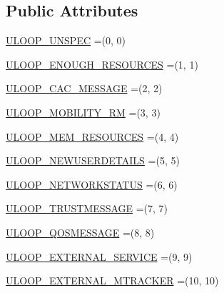 \subsection*{Public Attributes}
\begin{DoxyCompactItemize}
\item 
\hyperlink{enumeu_1_1uloop_1_1messages_1_1UloopMessages_1_1UloopMessageType_a457cbfce646e37005987a686aa1f876e}{U\+L\+O\+O\+P\+\_\+\+U\+N\+S\+P\+E\+C} =(0, 0)
\item 
\hyperlink{enumeu_1_1uloop_1_1messages_1_1UloopMessages_1_1UloopMessageType_ad2d2caa5e4a4fd68d44f422b23af44ac}{U\+L\+O\+O\+P\+\_\+\+E\+N\+O\+U\+G\+H\+\_\+\+R\+E\+S\+O\+U\+R\+C\+E\+S} =(1, 1)
\item 
\hyperlink{enumeu_1_1uloop_1_1messages_1_1UloopMessages_1_1UloopMessageType_a7290b987c0c214555491be7c4fc45835}{U\+L\+O\+O\+P\+\_\+\+C\+A\+C\+\_\+\+M\+E\+S\+S\+A\+G\+E} =(2, 2)
\item 
\hyperlink{enumeu_1_1uloop_1_1messages_1_1UloopMessages_1_1UloopMessageType_a4c6be9e1d2048fb126a0c309ed5e8acf}{U\+L\+O\+O\+P\+\_\+\+M\+O\+B\+I\+L\+I\+T\+Y\+\_\+\+R\+M} =(3, 3)
\item 
\hyperlink{enumeu_1_1uloop_1_1messages_1_1UloopMessages_1_1UloopMessageType_acfcddc123ef961d02b619e0e687a625a}{U\+L\+O\+O\+P\+\_\+\+M\+E\+M\+\_\+\+R\+E\+S\+O\+U\+R\+C\+E\+S} =(4, 4)
\item 
\hyperlink{enumeu_1_1uloop_1_1messages_1_1UloopMessages_1_1UloopMessageType_afe52072954431f52c76dfc1abcc26807}{U\+L\+O\+O\+P\+\_\+\+N\+E\+W\+U\+S\+E\+R\+D\+E\+T\+A\+I\+L\+S} =(5, 5)
\item 
\hyperlink{enumeu_1_1uloop_1_1messages_1_1UloopMessages_1_1UloopMessageType_a9e9d5e8074b3576749dcd41a7cc4545c}{U\+L\+O\+O\+P\+\_\+\+N\+E\+T\+W\+O\+R\+K\+S\+T\+A\+T\+U\+S} =(6, 6)
\item 
\hyperlink{enumeu_1_1uloop_1_1messages_1_1UloopMessages_1_1UloopMessageType_a00a2706ce85a9e84cbc0218c55804705}{U\+L\+O\+O\+P\+\_\+\+T\+R\+U\+S\+T\+M\+E\+S\+S\+A\+G\+E} =(7, 7)
\item 
\hyperlink{enumeu_1_1uloop_1_1messages_1_1UloopMessages_1_1UloopMessageType_ac62db035f61911b6d5a8a1de969cb817}{U\+L\+O\+O\+P\+\_\+\+Q\+O\+S\+M\+E\+S\+S\+A\+G\+E} =(8, 8)
\item 
\hyperlink{enumeu_1_1uloop_1_1messages_1_1UloopMessages_1_1UloopMessageType_a2e48a358b6ba1af599146c95c4449b09}{U\+L\+O\+O\+P\+\_\+\+E\+X\+T\+E\+R\+N\+A\+L\+\_\+\+S\+E\+R\+V\+I\+C\+E} =(9, 9)
\item 
\hyperlink{enumeu_1_1uloop_1_1messages_1_1UloopMessages_1_1UloopMessageType_a5279fcb970ff6e20df2536163d3cd33a}{U\+L\+O\+O\+P\+\_\+\+E\+X\+T\+E\+R\+N\+A\+L\+\_\+\+M\+T\+R\+A\+C\+K\+E\+R} =(10, 10)
\end{DoxyCompactItemize}
